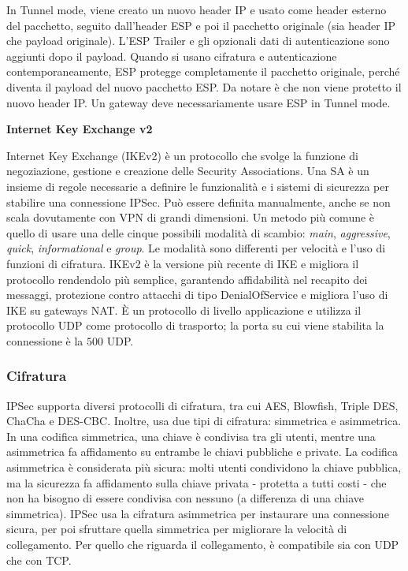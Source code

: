 In Tunnel mode, viene creato un nuovo header IP e usato come header esterno del pacchetto, seguito dall'header ESP e poi il pacchetto originale (sia header IP che payload originale).
L'ESP Trailer e gli opzionali dati di autenticazione sono aggiunti dopo il payload.
Quando si usano cifratura e autenticazione contemporaneamente, ESP protegge completamente il pacchetto originale, perché diventa il payload del nuovo pacchetto ESP.
Da notare è che non viene protetto il nuovo header IP.
Un gateway deve necessariamente usare ESP in Tunnel mode.

\noindent \textbf{Internet Key Exchange v2}

Internet Key Exchange \cite[RFC4306]{RFC4306} (IKEv2) è un protocollo che svolge la funzione di negoziazione, gestione e creazione delle Security Associations. Una SA è un insieme di regole necessarie a definire le funzionalità e i sistemi di sicurezza per stabilire una connessione IPSec. Può essere definita manualmente, anche se non scala dovutamente con VPN di grandi dimensioni. Un metodo più comune è quello di usare una delle cinque possibili modalità di scambio: \emph{main}, \emph{aggressive}, \emph{quick}, \emph{informational} e \emph{group}.
Le modalità sono differenti per velocità e l'uso di funzioni di cifratura. IKEv2 è la versione più recente di IKE e migliora il protocollo rendendolo più semplice, garantendo affidabilità nel recapito dei messaggi, protezione contro attacchi di tipo DenialOfService e migliora l'uso di IKE su gateways NAT.
È un protocollo di livello applicazione e utilizza il protocollo UDP come protocollo di trasporto; la porta su cui viene stabilita la connessione è la $500$ UDP.

\subsubsection{Cifratura}
IPSec supporta diversi protocolli di cifratura, tra cui AES, Blowfish, Triple DES, ChaCha e DES-CBC. Inoltre, usa due tipi di cifratura: simmetrica e asimmetrica. In una codifica simmetrica, una chiave è condivisa tra gli utenti, mentre una asimmetrica fa affidamento su entrambe le chiavi pubbliche e private. La codifica asimmetrica è considerata più sicura: molti utenti condividono la chiave pubblica, ma la sicurezza fa affidamento sulla chiave privata - protetta a tutti costi - che non ha bisogno di essere condivisa con nessuno (a differenza di una chiave simmetrica).
IPSec usa la cifratura asimmetrica per instaurare una connessione sicura, per poi sfruttare quella simmetrica per migliorare la velocità di collegamento. Per quello che riguarda il collegamento, è compatibile sia con UDP che con TCP.


